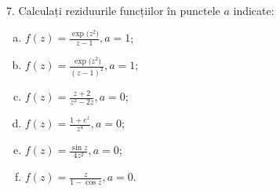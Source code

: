 \documentclass[12pt,a4paper]{article}
\theoremstyle{dotless}
\theoremstyle{dotlessdr}
\begin{document}
\vspace{1cm}

7. Calculați reziduurile funcțiilor în punctele $ a $ indicate:
\begin{enumerate}[(a)]
\item $ f(z) = \frac{\exp\big(z^2\big)}{z - 1}, a = 1 $;
\item $ f(z) = \frac{\exp\big(z^2\big)}{(z - 1)^2}, a = 1 $;
\item $ f(z) = \frac{z + 2}{z^2 - 2z}, a = 0 $;
\item $ f(z) = \frac{1 + e^z}{z^4}, a = 0 $;
\item $ f(z) = \frac{\sin z}{4z^2}, a = 0 $;
\item $ f(z) = \frac{z}{1 - \cos z}, a = 0 $.
\end{enumerate}
\end{document}
